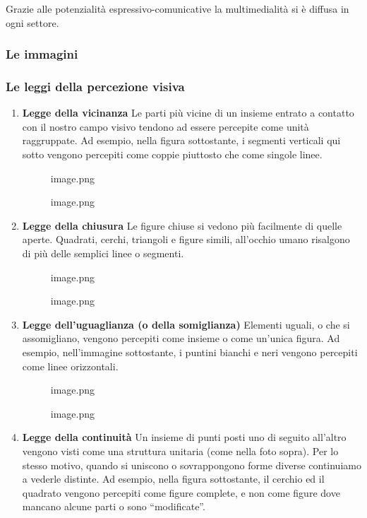 \documentclass[
]{article}
\begin{document}
Grazie alle potenzialità espressivo-comunicative la multimedialità si è diffusa in ogni settore.

\hypertarget{le-immagini}{%
\subsubsection{Le immagini}\label{le-immagini}}

\hypertarget{le-leggi-della-percezione-visiva}{%
\subsubsection{Le leggi della percezione visiva}\label{le-leggi-della-percezione-visiva}}

\begin{enumerate}
\def\labelenumi{\arabic{enumi}.}
\item
  \textbf{Legge della vicinanza}
  Le parti più vicine di un insieme entrato a contatto con il nostro campo visivo tendono ad essere percepite come unità raggruppate. Ad esempio, nella figura sottostante, i segmenti verticali qui sotto vengono percepiti come coppie piuttosto che come singole linee.

  \begin{figure}
  \centering
  {image.png}
  \caption{image.png}
  \end{figure}
\item
  \textbf{Legge della chiusura}
  Le figure chiuse si vedono più facilmente di quelle aperte. Quadrati, cerchi, triangoli e figure simili, all'occhio umano risalgono di più delle semplici linee o segmenti.

  \begin{figure}
  \centering
  {image.png}
  \caption{image.png}
  \end{figure}
\item
  \textbf{Legge dell'uguaglianza (o della somiglianza)}
  Elementi uguali, o che si assomigliano, vengono percepiti come insieme o come un'unica figura. Ad esempio, nell'immagine sottostante, i puntini bianchi e neri vengono percepiti come linee orizzontali.

  \begin{figure}
  \centering
  {image.png}
  \caption{image.png}
  \end{figure}
\item
  \textbf{Legge della continuità}
  Un insieme di punti posti uno di seguito all'altro vengono visti come una struttura unitaria (come nella foto sopra).
  Per lo stesso motivo, quando si uniscono o sovrappongono forme diverse continuiamo a vederle distinte. Ad esempio, nella figura sottostante, il cerchio ed il quadrato vengono percepiti come figure complete, e non come figure dove mancano alcune parti o sono ``modificate''.


\end{enumerate}
\end{document}
